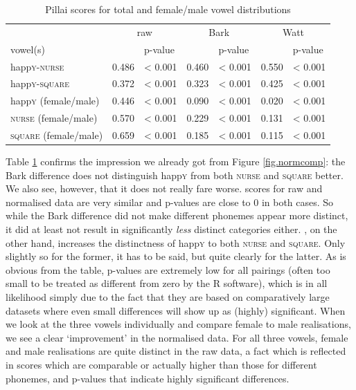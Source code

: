 \begin{table}[h]
	\centering
	\caption{Pillai scores for total and female/male vowel distributions}
	\begin{tabular}{lllllll}
		\hline
		& \multicolumn{2}{c}{raw} & \multicolumn{2}{c}{Bark} & \multicolumn{2}{c}{Watt}\\
		vowel(s) & \isi{Pillai} & p-value & \isi{Pillai} & p-value & \isi{Pillai} & p-value\\
		\hline
		happ\textsc{y}-\textsc{nurse} &
		0.486 &
		< 0.001 &
		0.460 &
		< 0.001 &
		0.550 &
		< 0.001\\
		happ\textsc{y}-\textsc{square} &
		0.372 &
		< 0.001 &
		0.323 &
		< 0.001 &
		0.425 &
		< 0.001 \\
		happ\textsc{y} (female/male) &
		0.446 &
		< 0.001 &
		0.090 &
		< 0.001 &
		0.020 &
		< 0.001 \\
		\textsc{nurse} (female/male) &
		0.570 &
		< 0.001 &
		0.229 &
		< 0.001 &
		0.131 &
		< 0.001 \\
		\textsc{square} (female/male) &
		0.659 &
		< 0.001 &
		0.185 &
		< 0.001 &
		0.115 &
		< 0.001 \\
		\hline
	\end{tabular}
	\label{tab.pillai}
\end{table}

Table \ref{tab.pillai} confirms the impression we already got from Figure \ref{fig.normcomp}: the Bark difference  does not distinguish happ\textsc{y} from both \textsc{nurse} and \textsc{square} better.
We also see, however, that it does not really fare worse.
 scores for raw and normalised data are very similar and p-values are close to 0 in both cases.
So while the Bark difference  did not make different phonemes appear more distinct, it did at least not result in significantly \emph{less} distinct categories either.
\citeauthor{wattfabricius2002}, on the other hand, increases the distinctness of happ\textsc{y} to both \textsc{nurse} and \textsc{square}.
Only slightly so for the former, it has to be said, but quite clearly for the latter.
As is obvious from the table, p-values are extremely low for all pairings (often too small to be treated as different from zero by the R software), which is in all likelihood simply due to the fact that they are based on comparatively large datasets where even small differences will show up as (highly) significant.
When we look at the three vowels individually and compare female to male realisations, we see a clear `improvement' in the normalised data.
For all three vowels, female and male realisations are quite distinct in the raw data, a fact which is reflected in  scores which are comparable or actually higher than those for different phonemes, and p-values that indicate highly significant differences. 


